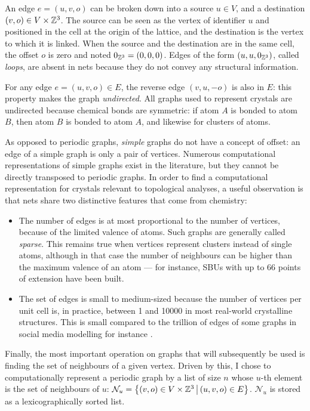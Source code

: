 \documentclass[main.tex]{subfiles}
\begin{document}
An edge $e = (u,v,o)$ can be broken down into a source $u\in V$, and a destination $(v,o)\in V\times\mathbb{Z}^3$. The source can be seen as the vertex of identifier $u$ and positioned in the cell at the origin of the lattice, and the destination is the vertex to which it is linked. When the source and the destination are in the same cell, the offset $o$ is zero and noted $0_{\mathbb{Z}^3} = (0,0,0)$. Edges of the form $(u,u,0_{\mathbb{Z}^3})$, called \emph{loops}, are absent in nets because they do not convey any structural information.

For any edge $e = (u,v,o)\in E$, the reverse edge $(v,u,-o)$ is also in $E$: this property makes the graph \emph{undirected}. All graphs used to represent crystals are undirected because chemical bonds are symmetric: if atom $A$ is bonded to atom $B$, then atom $B$ is bonded to atom $A$, and likewise for clusters of atoms.%

\medskip

As opposed to periodic graphs, \emph{simple} graphs do not have a concept of offset: an edge of a simple graph is only a pair of vertices. Numerous computational representations of simple graphs exist in the literature, but they cannot be directly transposed to periodic graphs. In order to find a computational representation for crystals relevant to topological analyses, a useful observation is that nets share two distinctive features that come from chemistry:
\begin{itemize}[noitemsep]
	\item The number of edges is at most proportional to the number of vertices, because of the limited valence of atoms. Such graphs are generally called \emph{sparse}. This remains true when vertices represent clusters instead of single atoms, although in that case the number of neighbours can be higher than the maximum valence of an atom --- for instance, SBUs with up to 66 points of extension have been built. \autocite{SBUs}
	\item The set of edges is small to medium-sized because the number of vertices per unit cell is, in practice, between 1 and \num{10000} in most real-world crystalline structures. This is small compared to the trillion of edges of some graphs in social media modelling for instance \autocite{facebook}.
\end{itemize}

Finally, the most important operation on graphs that will subsequently be used is finding the set of neighbours of a given vertex. Driven by this, I chose to computationally represent a periodic graph by a list of size $n$ whose $u$-th element is the set of neighbours of $u$: \linebreak$\mathcal N_u= \left\{(v,o)\in V\times\mathbb{Z}^3\,\middle|\,(u,v,o)\in E\right\}$. $\mathcal N_u$ is stored as a lexicographically sorted list. %
\end{document}
